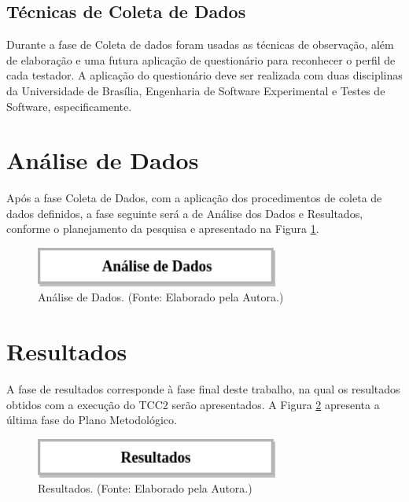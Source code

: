 \subsection{Técnicas de Coleta de Dados}

Durante a fase de Coleta de dados foram usadas as técnicas de observação, além de elaboração e uma futura aplicação de questionário para reconhecer o perfil de cada testador. A aplicação do questionário deve ser realizada com duas disciplinas da Universidade de Brasília, Engenharia de Software Experimental e Testes de Software, especificamente.

\section{Análise de Dados}

Após a fase Coleta de Dados, com a aplicação dos procedimentos de coleta de dados definidos, a fase seguinte será a de Análise dos Dados e Resultados, conforme o planejamento da pesquisa e apresentado na Figura \ref{fig:analiseDados}.

        \begin{figure}[H]
          \centering
          \includegraphics[width=8cm]{figuras/analiseDados.png}
          \caption{Análise de Dados. (Fonte: Elaborado pela Autora.)}
          \label{fig:analiseDados}

        \end{figure}

\section{Resultados}

A fase de resultados corresponde à fase final deste trabalho, na qual os resultados obtidos com a execução do TCC2 serão apresentados. A Figura \ref{fig:resultados} apresenta a última fase do Plano Metodológico.

        \begin{figure}[H]
          \centering
          \includegraphics[width=8cm]{figuras/resultados.png}
          \caption{Resultados. (Fonte: Elaborado pela Autora.)}
          \label{fig:resultados}

        \end{figure}


